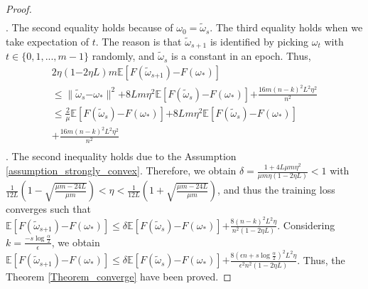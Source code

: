 \documentclass[letterpaper]{article}
\begin{document}
\begin{proof}
\begin{equation}
\begin{array}{ll}
\end{array} 
\end{equation}. The second equality  holds because of $\omega_0=\tilde{\omega}_s$. The third equality holds when we take expectation of $t$. The reason is that $\tilde{\omega}_{s+1}$  is identified by picking $\omega_t$ with $t\in\{0,1, ..., m-1\}$ randomly, and $\tilde{\omega}_s$ is a constant in an epoch.  Thus, 
\begin{equation}
\begin{array}{ll}
2\eta(1\mathrm{-}2\eta L)m \mathbb{E} [F(\tilde{\omega}_{s\mathrm{+}1}) \mathrm{-} F(\omega_\ast) ] \\
\le  \parallel  \tilde{\omega}_{s}\mathrm{-}\omega_\ast  \parallel^2 \mathrm{+} 8L m \eta^2 \mathbb{E}[F(\tilde{\omega}_s)\mathrm{-}F(\omega_\ast)] \mathrm{+}\frac{16m(n-k)^2L^2\eta^2}{n^2}\\ 
\le \frac{2}{\mu}\mathbb{E}[ F(\tilde{\omega}_{s}) \mathrm{-}  F(\omega_\ast)  ]\mathrm{+} 8L m \eta^2 \mathbb{E}[F(\tilde{\omega}_s)\mathrm{-}F(\omega_\ast)] \\
\mathrm{+}\frac{16m(n-k)^2L^2\eta^2}{n^2}\\
\end{array} 
\end{equation}. The second inequality holds due to the Assumption \ref{assumption_strongly_convex}. Therefore, we obtain $\delta=\frac{1+4L\mu m \eta^2}{  \mu m \eta (1-2\eta L)  } < 1$ with $\frac{1}{12L}\left( 1- \sqrt{\frac{\mu m - 24L}{\mu m}} \right) < \eta < \frac{1}{12L}\left( 1+ \sqrt{\frac{\mu m - 24L}{\mu m}} \right)$, and thus the training loss converges such that
$\mathbb{E}[F(\tilde{\omega}_{s\mathrm{+}1}) \mathrm{-} F(\omega_\ast)]  \le \delta \mathbb{E}[F(\tilde{\omega}_s)\mathrm{-}F(\omega_\ast)] \mathrm{+} \frac{8(n-k)^2L^2\eta}{n^2(1-2\eta L)}$. Considering $k\mathrm{=}\frac{-s\log\frac{\alpha}{2}}{\epsilon}$, we obtain $\mathbb{E}[F(\tilde{\omega}_{s\mathrm{+}1}) \mathrm{-} F(\omega_\ast)]  \le \delta \mathbb{E}[F(\tilde{\omega}_s)\mathrm{-}F(\omega_\ast)] \mathrm{+} \frac{8(\epsilon n+s\log\frac{\alpha}{2})^2L^2\eta}{\epsilon^2n^2(1-2\eta L)}$. Thus, the Theorem \ref{Theorem_converge} have been proved.
\end{proof}
\end{document}
